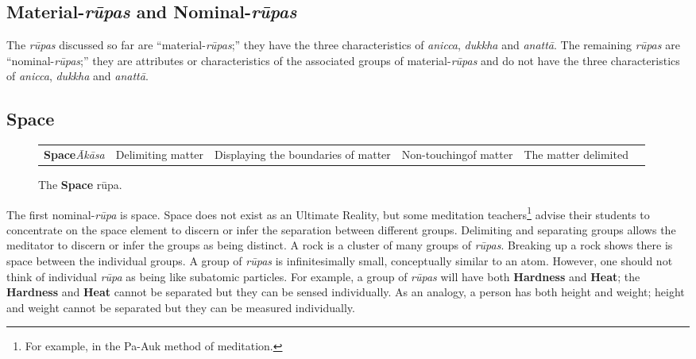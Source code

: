 \subsection*{Material-\textit{rūpas} and Nominal-\textit{rūpas}}

The \textit{rūpas} discussed so far are “material-\textit{rūpas};” they have the three characteristics of \textit{anicca}, \textit{dukkha} and \textit{anattā}. The remaining \textit{rūpas} are “nominal-\textit{rūpas};” they are attributes or characteristics of the associated groups of material-\textit{rūpas} and do not have the three characteristics of \textit{anicca}, \textit{dukkha} and \textit{anattā}.

\subsection*{Space}

\begin{figure} [H]
\setlength{\tabcolsep}{0pt}
\renewcommand{\arraystretch}{1.1}
\noindent\begin{tabular}{P{0.25\textwidth} | C{.185\textwidth} C{0.185\textwidth} C{0.185\textwidth} C{0.195\textwidth} m{0mm}}
\toprule
 &  &  &  & \\
\midrule
\textbf{Space}\newline \textit{Ākāsa} & Delimiting matter & Displaying the boundaries of matter & Non-touching\newline of matter & The matter delimited &\\[9mm]

\bottomrule
\end{tabular}
\caption[]{The \textbf{Space} rūpa.\footnotemark}
\end{figure}


The first nominal-\textit{rūpa} is space. Space does not exist as an Ultimate Reality, but some meditation teachers\footnote{For example, in the Pa-Auk method of meditation.} advise their students to concentrate on the space element to discern or infer the separation between different groups. Delimiting and separating groups allows the meditator to discern or infer the groups as being distinct. A rock is a cluster of many groups of \textit{rūpas}. Breaking up a rock shows there is space between the individual groups. A group of \textit{rūpas} is infinitesimally small, conceptually similar to an atom. However, one should not think of individual \textit{rūpa} as being like subatomic particles. For example, a group of \textit{rūpas} will have both \textbf{Hardness} and \textbf{Heat}; the \textbf{Hardness} and \textbf{Heat} cannot be separated but they can be sensed individually. As an analogy, a person has both height and weight; height and weight cannot be separated but they can be measured individually.

